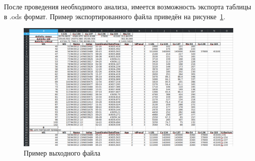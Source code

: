 После проведения необходимого анализа, имеется возможность экспорта таблицы в .ods формат. Пример экспортированного файла приведён на рисунке~\ref{fig:ris12}.

\begin{figure}[H]
	\centering
	\includegraphics[width=1\linewidth]{pics/ris12} %
	\caption{Пример выходного файла}
	\label{fig:ris12} %
\end{figure}

